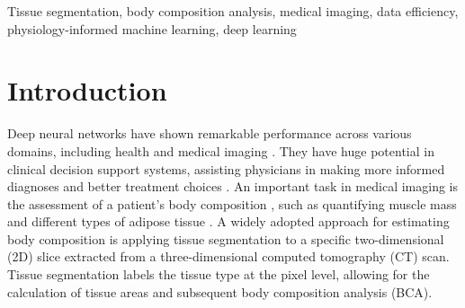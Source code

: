 \documentclass[conference]{IEEEtran}
\begin{document}
\maketitle

\begin{abstract}
Automated tissue segmentation in medical imaging plays a critical role in clinical AI-assisted decision-making, and particularly in the assessment of body composition from CT scans.
However, acquiring data and annotations of sufficient quality to train deep-learning models is expensive and time-consuming.
In this work, we propose a novel approach to improve data efficiency and model accuracy by leveraging domain knowledge about biologically relevant tissue-specific Hounsfield unit (HU) ranges as an inductive bias for learning. 
Specifically, we extend the input representation of deep learning-based segmentation models with binary masks indicating potential tissue types, where each binary mask is created from thresholds derived from medical literature.
Our method not only enhances segmentation performance by up to \SI{5}{\percent} for intramuscular adipose tissue but surpasses the performance of the baseline model
with \SI{50}{\percent} of the training data.
Our easy-to-apply method thus improves data efficiency and facilitates the development and use of segmentation models in resource-constrained clinical settings.
\end{abstract}

\begin{IEEEkeywords}
Tissue segmentation, body composition analysis, medical imaging, data efficiency, physiology-informed machine learning, deep learning
\end{IEEEkeywords}

\section{Introduction}
%
%
%
Deep neural networks have shown remarkable performance across various domains, including health and medical imaging \cite{schmidhuber2015deep, stadelmann2019beyond, emberger2023video, amirian2023mitigation}.
They have huge potential in clinical decision support systems, assisting physicians in making more informed diagnoses and better treatment choices \cite{kose_deep_2021, kabir_deep_2023, jermain2024deep}.
An important task in medical imaging is the assessment of a patient’s body composition \cite{ali_sarcopenia_2014}, such as quantifying muscle mass and different types of adipose tissue \cite{tolonen_methodology_2021}.
A widely adopted approach for estimating body composition is applying tissue segmentation to a specific two-dimensional (2D) slice extracted from a three-dimensional computed tomography (CT) scan.
Tissue segmentation labels the tissue type at the pixel level, allowing for the calculation of tissue areas and subsequent body composition analysis (BCA).
\end{document}
